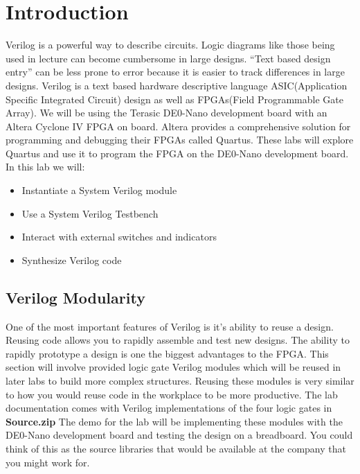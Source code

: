 \documentclass[12pt,journal]{IEEEtran}
\begin{document}




  \section{\bfseries Introduction}
    Verilog is a powerful way to describe circuits. Logic diagrams like those being used in lecture 
    can become cumbersome in large designs. ``Text based design entry'' can be less prone to error because 
    it is easier to track differences in large designs. Verilog is a text based hardware descriptive language
    ASIC(Application Specific Integrated Circuit) design as well as FPGAs(Field Programmable Gate Array).
     We will be using the Terasic DE0-Nano development board with an Altera Cyclone IV FPGA on board. Altera 
     provides a comprehensive solution for programming and debugging their FPGAs called Quartus. These 
     labs will explore Quartus and use it to program the FPGA on the DE0-Nano development board. In this lab we will:
    \begin{itemize}
      \item Instantiate a System Verilog module
      \item Use a System Verilog Testbench
      \item Interact with external switches and indicators
      \item Synthesize Verilog code
    \end{itemize}
  
    \subsection{Verilog Modularity}
      One of the most important features of Verilog is it's ability to reuse a design. Reusing code allows you to
      rapidly assemble and test new designs. The ability to rapidly prototype a design is one the biggest advantages 
      to the FPGA. This section will involve provided logic gate Verilog modules which will be reused in later labs to 
      build more complex structures. Reusing these modules is very similar to how you would reuse code in the workplace 
      to be more productive. The lab documentation comes with Verilog implementations of the four logic gates in 
      {\bfseries Source.zip} The demo for the lab will be implementing these modules with the DE0-Nano development
      board and testing the design on a breadboard. You could think of this as the source libraries that would
      be available at the company that you might work for. 
\end{document}
